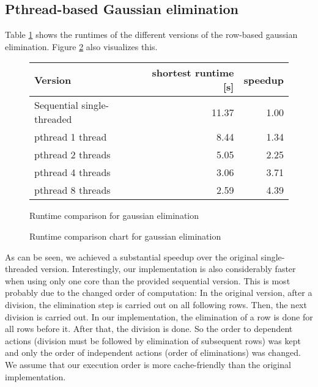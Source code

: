 \documentclass[]{article}
\begin{document}
\subsection{Pthread-based Gaussian elimination}

Table \ref{tab:gauss-runtime} shows the runtimes of the different versions of the row-based gaussian elimination. Figure \ref{fig:gauss-chart} also visualizes this.

\begin{figure}[h]
	\centering
	\begin{tabular}{|l|r|r|}
		\hline
		\textbf{Version} & \textbf{shortest runtime [s]} & \textbf{speedup} \\
		\hline
		Sequential single-threaded		& 11.37 & 1.00 \\ 
		\hline 
		pthread 1 thread				& 8.44 & 1.34 \\ 
		\hline 
		pthread 2 threads				& 5.05 & 2.25 \\ 
		\hline 
		pthread 4 threads 				& 3.06 & 3.71 \\ 
		\hline 
		pthread 8 threads				& 2.59 & 4.39 \\ 
		\hline 
	\end{tabular} 
	\caption{Runtime comparison for gaussian elimination}
	\label{tab:gauss-runtime}
\end{figure}

\begin{figure}[h]
	\centering
	\caption{Runtime comparison chart for gaussian elimination}
	\label{fig:gauss-chart}
\end{figure}

As can be seen, we achieved a substantial speedup over the original single-threaded version.
Interestingly, our implementation is also considerably faster when using only one core than the provided sequential version.
This is most probably due to the changed order of computation: In the original version, after a division, the elimination step is carried out on all following rows. Then, the next division is carried out. In our implementation, the elimination of a row is done for all rows before it. After that, the division is done. So the order to dependent actions (division must be followed by elimination of subsequent rows) was kept and only the order of independent actions (order of eliminations) was changed.
We assume that our execution order is more cache-friendly than the original implementation.

\FloatBarrier
\clearpage
\newpage

\begin{appendices}
\end{appendices}
\end{document}
